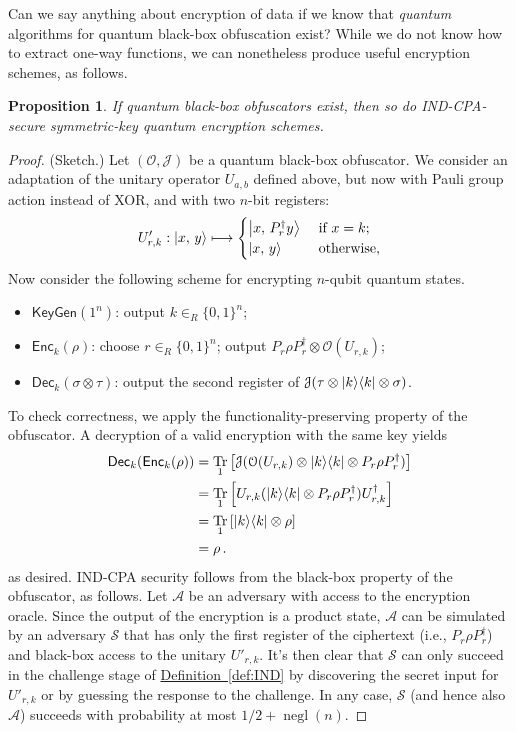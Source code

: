 \documentclass[11pt]{article}
\DeclareMathOperator{\tr}{Tr}
\numberwithin{equation}{section}
\newtheorem{prop}{Proposition}
\newcommand{\opn}{\operatorname}
\newcommand{\expref}[2]{\texorpdfstring{\hyperref[#2]{#1~\ref{#2}}}{#1~\ref{#2}}}
\newcommand{\algo}{\mathcal}
\newcommand{\negl}{\opn{negl}}
\newcommand{\KeyGen}{\ensuremath{\mathsf{KeyGen}}\xspace}
\newcommand{\Enc}{\ensuremath{\mathsf{Enc}}\xspace}
\newcommand{\Dec}{\ensuremath{\mathsf{Dec}}\xspace}
\newcommand{\inrand}{\in_R}
\begin{document}
{Can we say anything about encryption of data if we know that \emph{quantum} algorithms for quantum black-box obfuscation exist? While we do not know how to extract one-way functions, we can nonetheless produce useful encryption schemes, as follows.

\begin{prop}\label{prop:PKE-from-SKE}
If quantum black-box obfuscators exist, then so do IND-CPA-secure symmetric-key quantum encryption schemes.
\end{prop}
\begin{proof} (Sketch.)
Let $(\algo O, \algo J)$ be a quantum black-box obfuscator. We consider an adaptation of the unitary operator $U_{a, b}$ defined above, but now with Pauli group action instead of XOR, and with two $n$-bit registers:
$$
U'_{r, k} : {\left\vert{x,\, y}\right\rangle} \longmapsto
\begin{cases}
{\left\vert{x,\, P_r^\dagger y}\right\rangle} &\text{ if } x = k;\\
{\left\vert{x,\, y}\right\rangle} &\text{ otherwise},
\end{cases}
$$
Now consider the following scheme for encrypting $n$-qubit quantum states.
\begin{itemize}
\item $\KeyGen(1^n)$: output $k \inrand \{0, 1\}^n$;
\item $\Enc_{k}(\rho)$: choose $r \inrand \{0, 1\}^n$; output $P_r \rho P_r^\dagger \otimes \algo O(U_{r, k})$;
\item $\Dec_{k}(\sigma \otimes \tau)$: output  the second register of $\algo J(\tau \otimes \ket{k}\bra{k} \otimes \sigma)$.
\end{itemize}
To check correctness, we apply the functionality-preserving property of the obfuscator. A decryption of a valid encryption with the same key yields
\begin{align*}
\Dec_k (\Enc_k (\rho))  
&= \tr_1 \left[\algo J(\algo O(U_{r, k}) \otimes \ket{k}\bra{k} \otimes P_r \rho P_r^\dagger)\right] \\
&= \tr_1 \left[U_{r, k} (\ket{k}\bra{k} \otimes P_r \rho P_r^\dagger) U_{r, k}^\dagger\right] \\
&= \tr_1 \left[\ket{k}\bra{k} \otimes \rho \right] \\
& = \rho\,.
\end{align*}
as desired. IND-CPA security follows from the black-box property of the obfuscator, as follows. Let $\algo A$ be an adversary with access to the encryption oracle. Since the output of the encryption is a product state, $\algo A$ can be simulated by an adversary $\algo S$ that has only the first register of the ciphertext (i.e., $P_r \rho P_r^\dagger$) and black-box access to the unitary $U'_{r, k}$. It's then clear that $\algo S$ can only succeed in the challenge stage of \expref{Definition}{def:IND} by discovering the secret input for $U'_{r, k}$ or by guessing the response to the challenge. In any case, $\algo S$ (and hence also $\algo A$) succeeds with probability at most $1/2 + \negl(n)$.
\end{proof}

}
\end{document}
